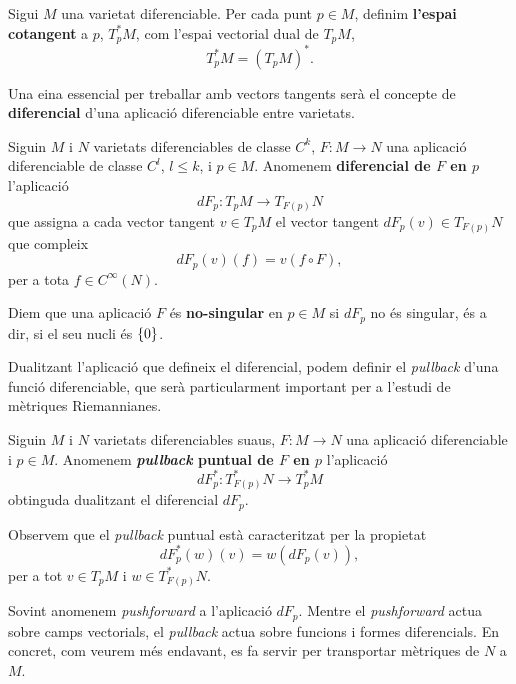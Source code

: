 \begin{defi}
    Sigui $M$ una varietat diferenciable. Per cada punt $p\in M$, definim \textbf{l'espai cotangent} a $p$, $T^*_pM$, com l'espai vectorial dual de $T_pM$,
    \begin{equation*}
        T^*_pM = (T_pM)^*.
    \end{equation*}
\end{defi}






Una eina essencial per treballar amb vectors tangents serà el concepte de \textbf{diferencial} d'una aplicació diferenciable entre varietats.
\begin{defi}
    Siguin $M$ i $N$ varietats diferenciables de classe $C^k$, $F:M\to N$ una aplicació diferenciable de classe $C^l$, $l\le k$, i $p\in M$. Anomenem \textbf{diferencial de $F$ en $p$} l'aplicació
    \begin{equation*}
        dF_p:T_pM\to T_{F(p)}N
    \end{equation*}
    que assigna a cada vector tangent $v\in T_pM$ el vector tangent $dF_p(v)\in T_{F(p)}N$ que compleix
    \begin{equation*}
        dF_p(v)(f) = v(f\circ F),
    \end{equation*}
    per a tota $f\in C^\infty(N)$.
\end{defi}
\begin{defi}
    Diem que una aplicació $F$ és \textbf{no-singular} en $p\in M$ si $dF_p$ no és singular, és a dir, si el seu nucli és $\{0\}$.
\end{defi}
Dualitzant l'aplicació que defineix el diferencial, podem definir el \textit{pullback} d'una funció diferenciable, que serà particularment important per a l'estudi de mètriques Riemannianes.
\begin{defi}
    Siguin $M$ i $N$ varietats diferenciables suaus, $F:M\to N$ una aplicació diferenciable i $p\in M$. Anomenem \textbf{\textit{pullback} puntual de $F$ en $p$} l'aplicació
    \begin{equation*}
        dF_p^*:T_{F(p)}^*N\to T^*_pM 
    \end{equation*}
    obtinguda dualitzant el diferencial $dF_p$.
\end{defi}
Observem que el \textit{pullback} puntual està caracteritzat per la propietat
\begin{equation*}
    dF_p^*(w)(v) = w(dF_p(v)),
\end{equation*}
per a tot $v\in T_pM$ i $w\in T^*_{F(p)}N$.
\begin{obs}
    Sovint anomenem \textit{pushforward} a l'aplicació $dF_p$. Mentre el \textit{pushforward} actua sobre camps vectorials, el \textit{pullback} actua sobre funcions i formes diferencials. En concret, com veurem més endavant, es fa servir per transportar mètriques de $N$ a $M$.
\end{obs}

